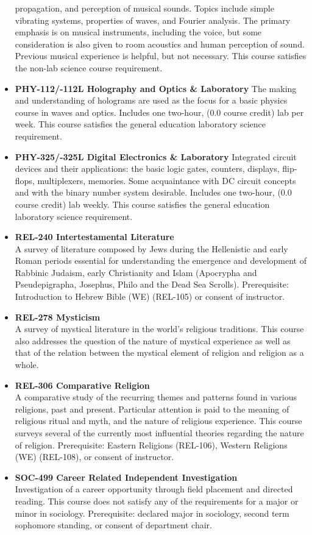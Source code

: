 \documentclass[
  letterpaper,
]{scrbook}
\begin{document}
\begin{itemize}
  propagation, and perception of musical sounds. Topics include simple
  vibrating systems, properties of waves, and Fourier analysis. The
  primary emphasis is on musical instruments, including the voice, but
  some consideration is also given to room acoustics and human
  perception of sound. Previous musical experience is helpful, but not
  necessary. This course satisfies the non-lab science course
  requirement.\\
\item
  \textbf{PHY-112/-112L Holography and Optics \& Laboratory} The making
  and understanding of holograms are used as the focus for a basic
  physics course in waves and optics. Includes one two-hour, (0.0 course
  credit) lab per week. This course satisfies the general education
  laboratory science requirement.
\item
  \textbf{PHY-325/-325L Digital Electronics \& Laboratory} Integrated
  circuit devices and their applications: the basic logic gates,
  counters, displays, flip-flops, multiplexers, memories. Some
  acquaintance with DC circuit concepts and with the binary number
  system desirable. Includes one two-hour, (0.0 course credit) lab
  weekly. This course satisfies the general education laboratory science
  requirement.
\item
  \textbf{REL-240 Intertestamental Literature}\\
  A survey of literature composed by Jews during the Hellenistic and
  early Roman periods essential for understanding the emergence and
  development of Rabbinic Judaism, early Christianity and Islam
  (Apocrypha and Pseudepigrapha, Josephus, Philo and the Dead Sea
  Scrolls). Prerequisite: Introduction to Hebrew Bible (WE) (REL-105) or
  consent of instructor.
\item
  \textbf{REL-278 Mysticism}\\
  A survey of mystical literature in the world's religious traditions.
  This course also addresses the question of the nature of mystical
  experience as well as that of the relation between the mystical
  element of religion and religion as a whole.
\item
  \textbf{REL-306 Comparative Religion}\\
  A comparative study of the recurring themes and patterns found in
  various religions, past and present. Particular attention is paid to
  the meaning of religious ritual and myth, and the nature of religious
  experience. This course surveys several of the currently most
  influential theories regarding the nature of religion. Prerequisite:
  Eastern Religions (REL-106), Western Religions (WE) (REL-108), or
  consent of instructor.
\item
  \textbf{SOC-499 Career Related Independent Investigation}\\
  Investigation of a career opportunity through field placement and
  directed reading. This course does not satisfy any of the requirements
  for a major or minor in sociology. Prerequisite: declared major in
  sociology, second term sophomore standing, or consent of department
  chair.
\end{itemize}
\end{document}
